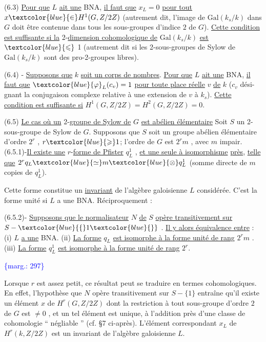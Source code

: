\documentclass[11pt]{article}
\newcommand{\scanpage}[1]{\par\bigskip\noindent{\small\sffamily[scan #1]}\par}
\newcommand{\mspage}[1]{{\small\sffamily[p.\,#1]}}
\newcommand{\hand}[1]{\textcolor{blue}{#1}}
\let\over\relax
\newcommand{\over}[2]{\textcolor{gray}{#1}\textcolor{blue}{\ensuremath{^{\!\nearrow}}#2}}
\newcommand{\margin}[1]{\textcolor{blue}{\{\textsf{marg.:} #1\}}}
\newcommand{\uline}[1]{\underline{#1}}
\begin{document}
(6.3) \uline{Pour que} $L$ \uline{ait une} BNA, \uline{il faut que} $x_L = 0$ \uline{pour tout} $x \hand{\in} H^1(G, Z/2Z)$
(autrement dit, l'image de $\mathrm{Gal}(k_s/k)$ dans $G$ doit être contenue dans tous
les sous-groupes d'indice $2$ de $G$). \uline{Cette condition est suffisante si la}
2-\uline{dimension cohomologique de} $\mathrm{Gal}(k_s/k)$ \uline{est} $\hand{\leqslant}$ 1 (autrement dit si les
2-sous-groupes de Sylow de $\mathrm{Gal}(k_s/k)$ sont des pro-2-groupes libres).

(6.4) - \uline{Supposons que} $k$ \uline{soit un corps de nombres}. \uline{Pour que} $L$ \uline{ait une}
BNA, \uline{il faut que} $\hand{\varphi}_L(c_v) = 1$ \uline{pour toute place réelle} $v$ \uline{de} $k$ ($c_v$ dési-%
gnant la conjugaison complexe relative à une extension de $v$ à $k_s$). \uline{Cette}
\uline{condition est suffisante si} $H^1(G, Z/2Z) = H^2(G, Z/2Z) = 0$.

(6.5) \uline{Le cas où un} 2-\uline{groupe de Sylow de} $G$ \uline{est abélien élémentaire}
Soit $S$ un 2-sous-groupe de Sylow de $G$. Supposons que $S$ soit un groupe
abélien élémentaire d'ordre $2^r$ , $r \hand{\geqslant} 1$; l'ordre de $G$ est $2^r m$ , avec $m$
impair.
(6.5.1)-\uline{Il existe une} $r$-\uline{forme de Pfister} $q^1_L$ , \uline{et une seule à isomorphisme}
\uline{près}, \uline{telle que} $2^r q_L \hand{\simeq} m \hand{\otimes} q^1_L$ (somme directe de $m$ copies de $q^1_L$).

Cette forme constitue un \uline{invariant} de l'algèbre galoisienne $L$ considérée.
C'est la forme unité si $L$ a une BNA. Réciproquement :

(6.5.2)- \uline{Supposons que le normalisateur} $N$ \uline{de} $S$ \uline{opère transitivement sur}
$S - \hand{\{}1\hand{\}}$ . \uline{Il y alors équivalence entre} :
(i) $L$ \uline{a une} BNA.
(ii) \uline{La forme} $q_L$ \uline{est isomorphe à la forme unité de rang} $2^r m$ .
(iii) \uline{La forme} $q^1_L$ \uline{est isomorphe à la forme unité de rang} $2^r$.

\margin{297}

\clearpage
\scanpage{119/298}
\mspage{- 11 -}

Lorsque $r$ est assez petit, ce résultat peut se traduire en termes
cohomologiques. En effet, l'hypothèse que $N$ opère transitivement sur
$S - \{1\}$ entraîne qu'il existe un élément $x$ de $H^{r}(G, Z/2Z)$ dont la
restriction à tout sous-groupe d'ordre $2$ de $G$ est $\neq 0$ , et un tel élément
est unique, à l'addition près d'une classe de cohomologie `` négli\over{g}{ge}able ''
(cf. §7 ci-après). L'élément correspondant $x_{L}$ de $H^{r}(k, Z/2Z)$ est un
invariant de l'algèbre galoisienne $L$.
\end{document}
